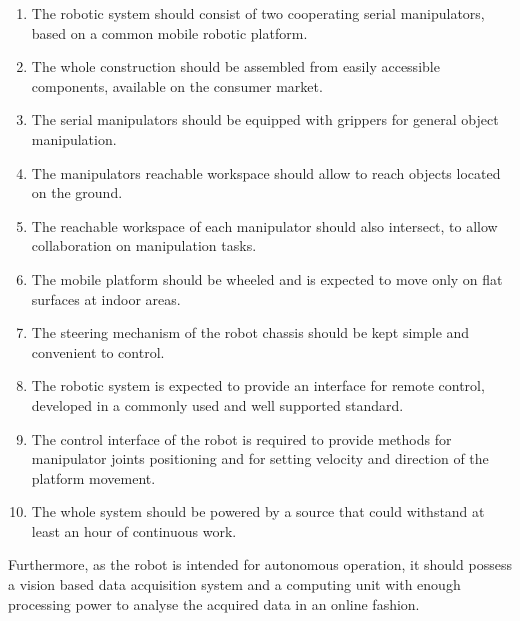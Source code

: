 \begin{enumerate}
\item The robotic system should consist of two cooperating serial manipulators, based on a common mobile robotic platform.
\item The whole construction should be assembled from easily accessible components, available on the consumer market.
\item The serial manipulators should be equipped with grippers for general object manipulation.
\item The manipulators reachable workspace should allow to reach objects located on the ground.
\item The reachable workspace of each manipulator should also intersect, to allow collaboration on manipulation tasks.
\item The mobile platform should be wheeled and is expected to move only on flat surfaces at indoor areas.
\item The steering mechanism of the robot chassis should be kept simple and convenient to control.
\item The robotic system is expected to provide an interface for remote control, developed in a commonly used and well supported standard.
\item The control interface of the robot is required to provide methods for manipulator joints positioning and for setting velocity and direction of the platform movement. 
\item The whole system should be powered by a source that could withstand at least an hour of continuous work.
\end{enumerate}

Furthermore, as the robot is intended for autonomous operation, it should possess a vision based data acquisition system and a computing unit with enough processing power to analyse the acquired data in an online fashion.

